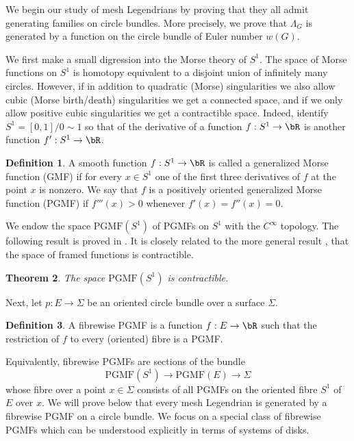 \documentclass[JEP,XML,SOM,Unicode,NoFloatCountersInSection]{cedram}
\newcommand{\PGMF}{\mathrm{PGMF}}
\theoremstyle{plain}
\newtheorem{theorem}{Theorem}[section]
\theoremstyle{definition}
\newtheorem{definition}[theorem]{Definition}
\begin{document}
We begin our study of mesh Legendrians by proving that they all admit generating families on circle bundles. More precisely, we prove that $\Lambda_G$ is generated by a function on the circle bundle of Euler number $w(G)$.

We first make a small digression into the Morse theory of $S^1$. The space of Morse functions on $S^1$ is homotopy equivalent to a disjoint union of infinitely many circles. However, if in addition to quadratic (Morse) singularities we also allow cubic (Morse birth/death) singularities we get a connected space, and if we only allow positive cubic singularities we get a contractible space. Indeed, identify $S^1 = [0,1]/ 0 \sim 1$ so that of the derivative of a function $f:S^1 \to \bR$ is another function $f':S^1 \to \bR$.
\begin{definition}
A smooth function $f:S^1 \to \bR$ is called a generalized Morse function (GMF) if for every $x \in S^1$ one of the first three derivatives of $f$ at the point $x$ is nonzero. We say that $f$ is a positively oriented generalized Morse function (PGMF) if $f'''(x)>0$ whenever $f'(x)=f''(x)=0$. \end{definition}

We endow the space $\PGMF(S^1)$ of PGMFs on $S^1$ with the $C^\infty$ topology. The following result is proved in \cite{IK93}. It is closely related to the more general result \cite{I87}, \cite{EM12} that the space of framed functions is contractible.

\begin{theorem}\label{contractibility}
The space $\PGMF(S^1)$ is contractible.
\end{theorem}

Next, let $p: E \to \Sigma$ be an oriented circle bundle over a surface $\Sigma$.

\begin{definition}
A fibrewise PGMF is a function $f:E \to \bR$ such that the restriction of $f$ to every (oriented) fibre is a PGMF.
\end{definition}

Equivalently, fibrewise PGMFs are sections of the bundle
\[
\PGMF(S^1) \to \PGMF(E) \to \Sigma
\]
whose fibre over a point $x \in \Sigma$ consists of all PGMFs on the oriented fibre $S^1$ of $E$ over $x$. We will prove below that every mesh Legendrian is generated by a fibrewise PGMF on a circle bundle. We focus on a special class of fibrewise PGMFs which can be understood explicitly in terms of systems of disks.
\end{document}
